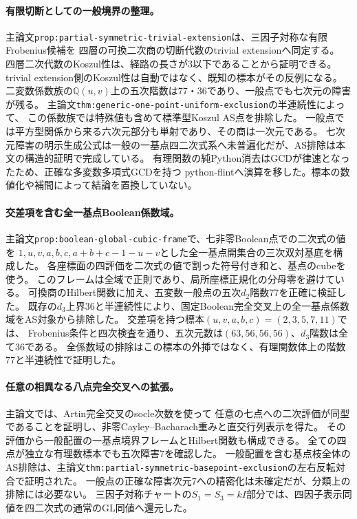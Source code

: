 \documentclass[11pt,a4paper]{ltjsarticle}
\begin{document}
\paragraph{有限切断としての一般境界の整理。}
主論文\texttt{prop:partial-symmetric-trivial-extension}は、三因子対称な有限Frobenius候補を
四層の可換二次商の切断代数のtrivial extensionへ同定する。
四層二次代数のKoszul性は、経路の長さが3以下であることから証明できる。
trivial extension側のKoszul性は自動ではなく、既知の標本がその反例になる。
二変数係数族の$\mathbb Q(u,v)$上の五次階数は77・36であり、一般点でも七次元の障害が残る。
主論文\texttt{thm:generic-one-point-uniform-exclusion}の半連続性によって、
この係数族では特殊値も含めて標準型Koszul AS点を排除した。
一般点では平方型関係から来る六次元部分も単射であり、その商は一次元である。
七次元障害の明示生成公式は一般の一基点四二次式系へ未普遍化だが、AS排除は本文の構造的証明で完成している。
有理関数の純Python消去はGCDが律速となったため、正確な多変数多項式GCDを持つ
python-flintへ演算を移した。標本の数値化や補間によって結論を置換していない。

\paragraph{交差項を含む全一基点Boolean係数域。}
主論文\texttt{prop:boolean-global-cubic-frame}で、七非零Boolean点での二次式の値を
$1,u,v,a,b,c,a+b+c-1-u-v$とした全一基点開集合の三次双対基底を構成した。
各座標面の四評価を二次式の値で割った符号付き和と、基点のcubeを使う。
このフレームは全域で正則であり、局所座標正規化の分母零を避けている。
可換商のHilbert関数に加え、五変数一般点の五次$d_2$階数77を正確に検証した。
既存の$d_3$上界36と半連続性により、固定Boolean完全交叉上の全一基点係数域をAS対象から排除した。
交差項を持つ標本$(u,v,a,b,c)=(2,3,5,7,11)$では、
Frobenius条件と四次検査を通り、五次元数は$(63,56,56,56)$、$d_3$階数は全て36である。
全係数域の排除はこの標本の外挿ではなく、有理関数体上の階数77と半連続性で証明した。

\paragraph{任意の相異なる八点完全交叉への拡張。}
主論文では、Artin完全交叉のsocle次数を使って
任意の七点への二次評価が同型であることを証明し、非零Cayley--Bacharach重みと直交行列表示を得た。
その評価から一般配置の一基点境界フレームとHilbert関数も構成できる。
全ての四点が独立な有理数標本でも五次障害7を確認した。
一般配置を含む基点枝全体のAS排除は、主論文\texttt{thm:partial-symmetric-basepoint-exclusion}の左右反転対合で証明された。
一般点の正確な障害次元7への精密化は未確定だが、分類上の排除には必要ない。
三因子対称チャートの$S_1=S_3=kI$部分では、四因子表示同値を四二次式の通常のGL同値へ還元した。
\end{document}
